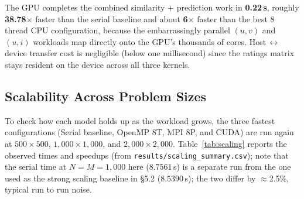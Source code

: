 \documentclass[11pt,a4paper]{article}
\newcommand{\code}[1]{\texttt{\small #1}}
\begin{document}
The GPU completes the combined similarity + prediction work in \textbf{0.22\,s},
roughly \textbf{38.78$\times$} faster than the serial baseline and about
\textbf{6$\times$} faster than the best 8 thread CPU configuration, because
the embarrassingly parallel $(u,v)$ and $(u,i)$ workloads map directly onto the
GPU's thousands of cores. Host\,$\leftrightarrow$\,device transfer cost is
negligible (below one millisecond) since the ratings matrix stays resident on the
device across all three kernels.

\FloatBarrier
\subsection{Scalability Across Problem Sizes}\label{sec:scaling}

To check how each model holds up as the workload grows, the three fastest
configurations (Serial baseline, OpenMP 8T, MPI 8P, and CUDA) are run again at
$500\times500$, $1{,}000\times1{,}000$, and $2{,}000\times2{,}000$.
Table~\ref{tab:scaling} reports the observed times and speedups (from
\code{results/scaling\_summary.csv}); note that the serial time at
$N=M=1{,}000$ here ($8.7561$\,s) is a separate run from the one used as the
strong scaling baseline in §5.2 ($8.5390$\,s); the two differ by
$\approx$2.5\%, typical run to run noise.

\begin{table}[!htbp]
\centering
{}
\caption{Problem size sweep at the fastest worker count per technology.
Serial grows as expected ($O(N^2 M)$: $0.99 \rightarrow 8.76 \rightarrow
78.64$\,s tracks the $N^3$ growth factor). OpenMP speedup is stable
($6.45\rightarrow 6.26 \rightarrow 6.05$); MPI improves from $500\times500$
(where \code{MPI\_Allgatherv} is not yet amortised) before declining at the
largest size; \textbf{CUDA speedup grows with $N$ from $32.6\times$ to
$55.3\times$} as the GPU fills its SMs and amortises launch and PCIe
overheads.}
\label{tab:scaling}
\end{table}
\end{document}
